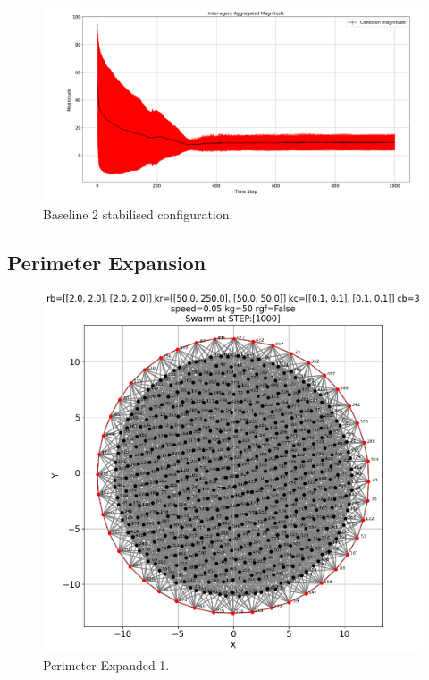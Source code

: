 \documentclass[12pt,a4paper]{IEEEtran}
\begin{document}
\begin{figure}[H]
	\begin{center}
		\includegraphics[width=1.0\linewidth]{figures/baseline2Magnitude}
	\end{center}
	\caption{Baseline 2 stabilised configuration. \label{fig:baseline2Magnitude}}
\end{figure}

\subsection{Perimeter Expansion}

\begin{figure}[H]
	\begin{center}
		\includegraphics[width=1.0\linewidth]{figures/perimExpand1}
	\end{center}
	\caption{Perimeter Expanded 1. \label{fig:perimExpand1}}
\end{figure}
\end{document}
